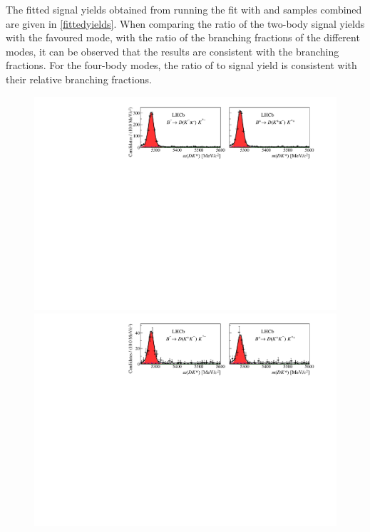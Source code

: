 The fitted signal yields obtained from running the fit with \Bp and \Bm samples combined are given in \tab\ref{fittedyields}. When comparing the ratio of the two-body signal yields with the favoured mode, with the ratio of the branching fractions of the different \Dz modes, it can be observed that the results are consistent with the branching fractions. For the four-body modes, the ratio of \kpipipi to \pipipipi signal yield is consistent with their relative branching fractions.

\begin{figure}
\includegraphics[width=\linewidth]{figures/results/canvas_d2kpi.pdf}
\hfill
\includegraphics[width=\linewidth]{figures/results/canvas_d2kk.pdf}
\hfill

\end{figure}
